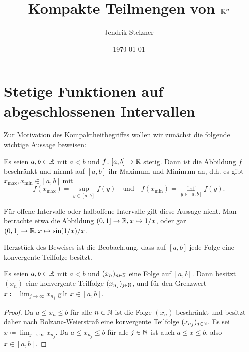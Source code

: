 \documentclass[a4paper,10pt]{article}
\title{Kompakte Teilmengen von $\mathbb{R}^n$}
\author{Jendrik Stelzner}
\date{\today}
\begin{document}
\maketitle


\section{Stetige Funktionen auf abgeschlossenen Intervallen}


Zur Motivation des Kompaktheitbegriffes wollen wir zunächst die folgende wichtige Aussage beweisen:


\begin{lem}\label{lem: stetig auf Intervall}
 Es seien $a,b \in \mathbb{R}$ mit $a < b$ und $f \colon [a,b] \to \mathbb{R}$ stetig. Dann ist die Abbildung $f$ beschränkt und nimmt auf $[a,b]$ ihr Maximum und Minimum an, d.h. es gibt $x_{\text{max}}, x_{\text{min}} \in [a,b]$ mit
 \[
  f(x_{\text{max}}) = \sup_{y \in [a,b]} f(y)
  \quad
  \text{und}
  \quad
  f(x_{\text{min}}) = \inf_{y \in [a,b]} f(y).
 \]
\end{lem}


Für offene Intervalle oder halboffene Intervalle gilt diese Aussage nicht. Man betrachte etwa die Abbildung $(0,1] \to \mathbb{R}, x \mapsto 1/x$, oder gar $(0,1] \to \mathbb{R}, x \mapsto \sin(1/x)/x$.


Herzstück des Beweises ist die Beobachtung, dass auf $[a,b]$ jede Folge eine konvergente Teilfolge besitzt.


\begin{lem}\label{lem: Intervall ist kompakt}
 Es seien $a,b \in \mathbb{R}$ mit $a < b$ und $(x_n)_{n \in \mathbb{N}}$ eine Folge auf $[a,b]$. Dann besitzt $(x_n)$ eine konvergente Teilfolge $(x_{n_j})_{j \in \mathbb{N}}$, und für den Grenzwert $x \coloneqq \lim_{j \to \infty} x_{n_j}$ gilt $x \in [a,b]$.
\end{lem}
\begin{proof}
 Da $a \leq x_n \leq b$ für alle $n \in \mathbb{N}$ ist die Folge $(x_n)$ beschränkt und besitzt daher nach Bolzano-Weierstraß eine konvergente Teilfolge $(x_{n_j})_{j \in \mathbb{N}}$. Es sei $x \coloneqq \lim_{j \to \infty} x_{n_j}$. Da $a \leq x_{n_j} \leq b$ für alle $j \in \mathbb{N}$ ist auch $a \leq x \leq b$, also $x \in [a,b]$.
\end{proof}
\end{document}
